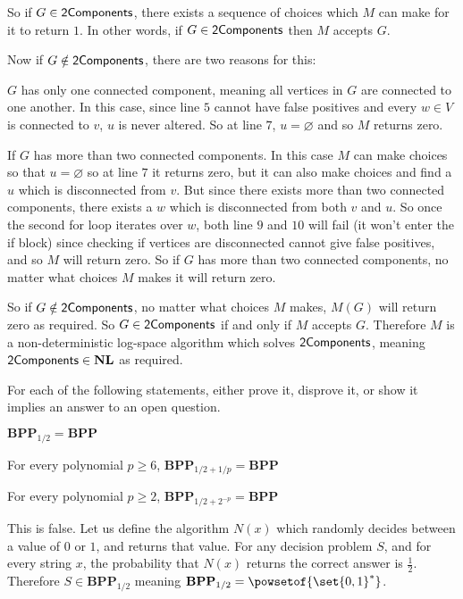\documentclass[10pt]{article}
\def\NL{\mathbf{NL}}
\def\BPP{\mathbf{BPP}}
\begin{document}
So if $G\in\mathsf{2Components}$, there exists a sequence of choices which $M$ can make for it to return $1$.
In other words, if $G\in\mathsf{2Components}$ then $M$ accepts $G$.

Now if $G\notin\mathsf{2Components}$, there are two reasons for this:
\benum
    \item $G$ has only one connected component, meaning all vertices in $G$ are connected to one another.
    In this case, since line $5$ cannot have false positives and every $w\in V$ is connected to $v$, $u$ is never altered.
    So at line $7$, $u=\varnothing$ and so $M$ returns zero.

    \item If $G$ has more than two connected components.
    In this case $M$ can make choices so that $u=\varnothing$ so at line $7$ it returns zero, but it can also make choices and find a $u$ which is disconnected from $v$.
    But since there exists more than two connected components, there exists a $w$ which is disconnected from both $v$ and $u$.
    So once the second for loop iterates over $w$, both line $9$ and $10$ will fail (it won't enter the if block) since checking if vertices are disconnected cannot give false positives, and so $M$ will
    return zero.
    So if $G$ has more than two connected components, no matter what choices $M$ makes it will return zero.
\eenum

So if $G\notin\mathsf{2Components}$, no matter what choices $M$ makes, $M(G)$ will return zero as required.
So $G\in\mathsf{2Components}$ if and only if $M$ accepts $G$.
Therefore $M$ is a non-deterministic log-space algorithm which solves $\mathsf{2Components}$, meaning $\twocomp\in\NL$ as required.

\begin{exercise*}

    For each of the following statements, either prove it, disprove it, or show it implies an answer to an open question.
    \benum
        \item $\BPP_{1/2}=\BPP$
        \item For every polynomial $p\geq6$, $\BPP_{1/2+1/p}=\BPP$
        \item For every polynomial $p\geq2$, $\BPP_{1/2+2^{-p}}=\BPP$
    \eenum

\end{exercise*}

\benum
    \item This is false.
    Let us define the algorithm $N(x)$ which randomly decides between a value of $0$ or $1$, and returns that value.
    For any decision problem $S$, and for every string $x$, the probability that $N(x)$ returns the correct answer is $\frac12$.
    Therefore $S\in\BPP_{1/2}$ meaning $\BPP_{1/2}=\powsetof{\set{0,1}^*}$.
\end{document}
